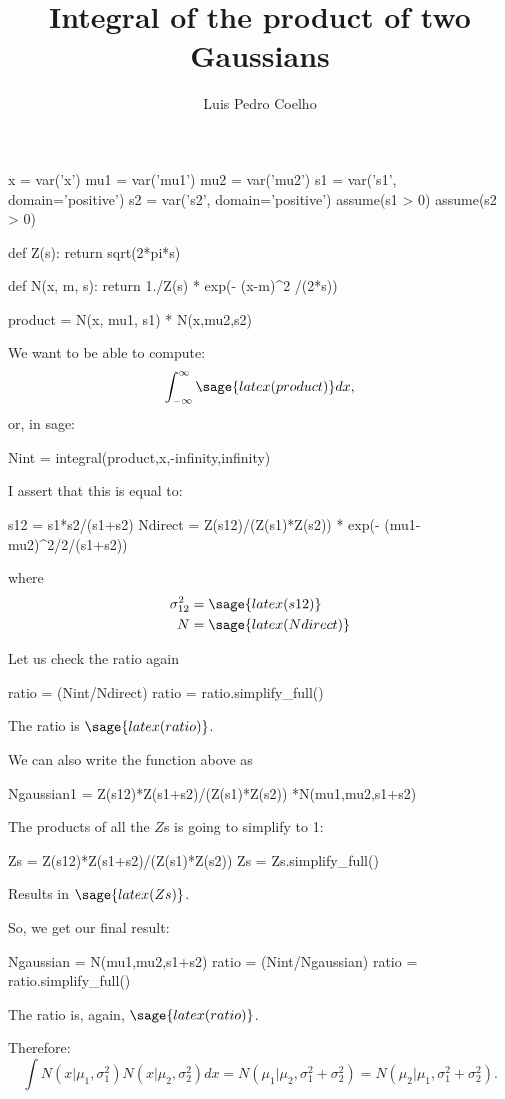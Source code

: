 \documentclass{article}
\begin{document}
\title{Integral of the product of two Gaussians}
\author{Luis Pedro Coelho}
\maketitle

\begin{sageblock}
x = var('x')
mu1 = var('mu1')
mu2 = var('mu2')
s1 = var('s1', domain='positive')
s2 = var('s2', domain='positive')
assume(s1 > 0)
assume(s2 > 0)

def Z(s):
    return sqrt(2*pi*s)

def N(x, m, s):
    return 1./Z(s) * exp(- (x-m)^2 /(2*s))
\end{sageblock}

\begin{sageblock}
product = N(x, mu1, s1) * N(x,mu2,s2)
\end{sageblock}

We want to be able to compute:
\begin{equation}
\int_{-\infty}^{\infty} \sage{latex(product)} dx,
\end{equation}
or, in sage:
\begin{sageblock}
Nint = integral(product,x,-infinity,infinity)
\end{sageblock}

I assert that this is equal to:
\begin{sageblock}
s12 = s1*s2/(s1+s2)
Ndirect = Z(s12)/(Z(s1)*Z(s2)) * exp(- (mu1-mu2)^2/2/(s1+s2))
\end{sageblock}
where
\begin{align}
\sigma^2_{12} &= \sage{latex(s12)}\\
N &= \sage{latex(Ndirect)}
\end{align}

Let us check the ratio again
\begin{sageblock}
ratio = (Nint/Ndirect)
ratio = ratio.simplify_full()
\end{sageblock}
The ratio is $\sage{latex(ratio)}$.

We can also write the function above as
\begin{sageblock}
Ngaussian1 = Z(s12)*Z(s1+s2)/(Z(s1)*Z(s2)) *N(mu1,mu2,s1+s2)
\end{sageblock}
The products of all the $Z$s is going to simplify to 1:
\begin{sageblock}
Zs = Z(s12)*Z(s1+s2)/(Z(s1)*Z(s2))
Zs = Zs.simplify_full()
\end{sageblock}
Results in $\sage{latex(Zs)}$.

So, we get our final result:
\begin{sageblock}
Ngaussian = N(mu1,mu2,s1+s2)
ratio = (Nint/Ngaussian)
ratio = ratio.simplify_full()
\end{sageblock}
The ratio is, again, $\sage{latex(ratio)}$.

Therefore:
\begin{equation}
\int N(x|\mu_1, \sigma_1^2) N(x|\mu_2, \sigma_2^2) dx =
    N(\mu_1|\mu_2, \sigma_1^2 + \sigma_2^2) =
    N(\mu_2|\mu_1, \sigma_1^2 + \sigma_2^2).
\end{equation}
\end{document}
